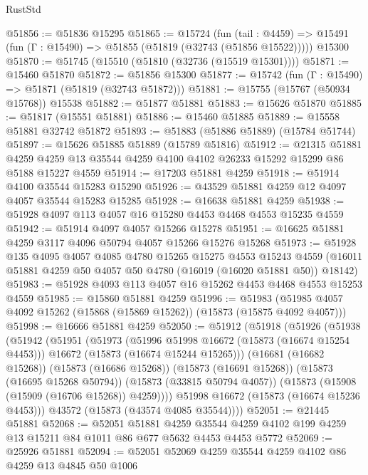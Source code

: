 \begin{lexlean}{RustStd}
\begin{coremodule}
@51856 := @51836 @15295
@51865 := @15724
    (fun (tail : @4459) => @15491 (fun (Γ : @15490) => @51855 (@51819 (@32743 (@51856 @15522)))))
    @15300
@51870 := @51745 (@15510 (@51810 (@32736 (@15519 @15301))))
@51871 := @15460 @51870
@51872 := @51856 @15300
@51877 := @15742 (fun (Γ : @15490) => @51871 (@51819 (@32743 @51872)))
@51881 := @15755 (@15767 (@50934 @15768)) @15538
@51882 := @51877 @51881
@51883 := @15626 @51870
@51885 := @51817 (@15551 @51881)
@51886 := @15460 @51885
@51889 := @15558 @51881 @32742 @51872
@51893 := @51883 (@51886 @51889) (@15784 @51744)
@51897 := @15626 @51885 @51889 (@15789 @51816)
@51912 := @21315
    @51881
    @4259
    @4259
    @13
    @35544
    @4259
    @4100
    @4102
    @26233
    @15292
    @15299
    @86
    @5188
    @15227
    @4559
@51914 := @17203 @51881 @4259
@51918 := @51914 @4100 @35544 @15283 @15290
@51926 := @43529 @51881 @4259 @12 @4097 @4057 @35544 @15283 @15285
@51928 := @16638 @51881 @4259
@51938 := @51928 @4097 @113 @4057 @16 @15280 @4453 @4468 @4553 @15235 @4559
@51942 := @51914 @4097 @4057 @15266 @15278
@51951 := @16625 @51881 @4259 @3117 @4096 @50794 @4057 @15266 @15276 @15268
@51973 := @51928
    @135
    @4095
    @4057
    @4085
    @4780
    @15265
    @15275
    @4553
    @15243
    @4559
    (@16011 @51881 @4259 @50 @4057 @50 @4780 (@16019 (@16020 @51881 @50)) @18142)
@51983 := @51928 @4093 @113 @4057 @16 @15262 @4453 @4468 @4553 @15253 @4559
@51985 := @15860 @51881 @4259
@51996 := @51983 (@51985 @4057 @4092 @15262 (@15868 (@15869 @15262)) (@15873 (@15875 @4092 @4057)))
@51998 := @16666 @51881 @4259
@52050 := @51912
    (@51918
      (@51926
        (@51938
          (@51942
            (@51951
              (@51973
                (@51996 @51998 @16672 (@15873 (@16674 @15254 @4453)))
                @16672
                (@15873 (@16674 @15244 @15265)))
              (@16681 (@16682 @15268))
              (@15873 (@16686 @15268))
              (@15873 (@16691 @15268))
              (@15873 (@16695 @15268 @50794))
              (@15873 (@33815 @50794 @4057))
              (@15873 (@15908 (@15909 (@16706 @15268)) @4259))))
          @51998
          @16672
          (@15873 (@16674 @15236 @4453)))
        @43572
        (@15873 (@43574 @4085 @35544))))
@52051 := @21445 @51881
@52068 := @52051
    @51881
    @4259
    @35544
    @4259
    @4102
    @199
    @4259
    @13
    @15211
    @84
    @1011
    @86
    @677
    @5632
    @4453
    @4453
    @5772
@52069 := @25926 @51881
@52094 := @52051
    @52069
    @4259
    @35544
    @4259
    @4102
    @86
    @4259
    @13
    @4845
    @50
    @1006

\end{coremodule}
\end{lexlean}
